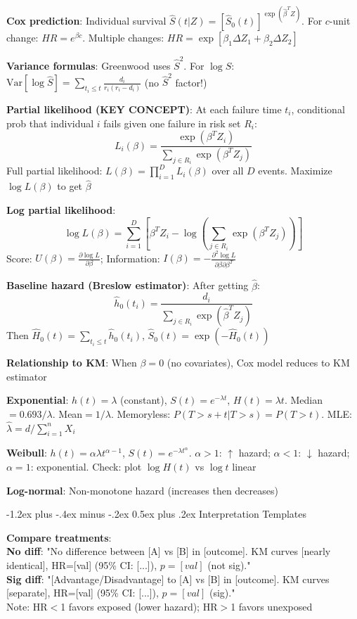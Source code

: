 ﻿\documentclass[10pt,letterpaper]{extarticle}
\makeatletter
\renewcommand{\section}{\@startsection{section}{1}{0mm}%
                                {-1.2ex plus -.4ex minus -.2ex}%
                                {0.5ex plus .2ex}%
                                {\normalfont\normalsize\bfseries}}
\newcommand{\h}[1]{\textbf{#1}}
\makeatother
\begin{document}
\begin{multicols}{3}
\h{Cox prediction}: Individual survival $\hat{S}(t|Z)=[\hat{S}_0(t)]^{\exp(\hat{\beta}^T Z)}$. For $c$-unit change: $HR=e^{\beta c}$. Multiple changes: $HR=\exp[\beta_1\Delta Z_1+\beta_2\Delta Z_2]$

\h{Variance formulas}: Greenwood uses $\hat{S}^2$. For $\log\hat{S}$: $\text{Var}[\log\hat{S}]=\sum_{t_i \le t}\frac{d_i}{r_i(r_i-d_i)}$ (no $\hat{S}^2$ factor!)

\h{Partial likelihood (KEY CONCEPT)}: At each failure time $t_i$, conditional prob that individual $i$ fails given one failure in risk set $R_i$:
$$L_i(\beta) = \frac{\exp(\beta^T Z_i)}{\sum_{j \in R_i} \exp(\beta^T Z_j)}$$
Full partial likelihood: $L(\beta) = \prod_{i=1}^D L_i(\beta)$ over all $D$ events. Maximize $\log L(\beta)$ to get $\hat{\beta}$

\h{Log partial likelihood}: \\
$$\log L(\beta) = \sum_{i=1}^D \left[\beta^T Z_i - \log\left(\sum_{j \in R_i} \exp(\beta^T Z_j)\right)\right]$$
Score: $U(\beta) = \frac{\partial \log L}{\partial \beta}$; Information: $I(\beta) = -\frac{\partial^2 \log L}{\partial \beta \partial \beta^T}$

\h{Baseline hazard (Breslow estimator)}: After getting $\hat{\beta}$:
$$\hat{h}_0(t_i) = \frac{d_i}{\sum_{j \in R_i} \exp(\hat{\beta}^T Z_j)}$$
Then $\hat{H}_0(t) = \sum_{t_i \le t} \hat{h}_0(t_i)$, $\hat{S}_0(t) = \exp(-\hat{H}_0(t))$

\h{Relationship to KM}: When $\beta=0$ (no covariates), Cox model reduces to KM estimator

\h{Exponential}: $h(t)=\lambda$ (constant), $S(t)=e^{-\lambda t}$, $H(t)=\lambda t$. Median$=0.693/\lambda$. Mean$=1/\lambda$. Memoryless: $P(T>s+t|T>s)=P(T>t)$. MLE: $\hat{\lambda}=d/\sum_{i=1}^n X_i$

\h{Weibull}: $h(t)=\alpha\lambda t^{\alpha-1}$, $S(t)=e^{-\lambda t^\alpha}$. $\alpha>1$: $\uparrow$ hazard; $\alpha<1$: $\downarrow$ hazard; $\alpha=1$: exponential. Check: plot $\log H(t)$ vs $\log t$ linear

\h{Log-normal}: Non-monotone hazard (increases then decreases)

\vspace{2pt}
\section{Interpretation Templates}

\h{Compare treatments}: \\
\textbf{No diff}: "No difference between [A] vs [B] in [outcome]. KM curves [nearly identical], HR=[val] (95\% CI: [...]), $p=[val]$ (not sig)." \\
\textbf{Sig diff}: "[Advantage/Disadvantage] to [A] vs [B] in [outcome]. KM curves [separate], HR=[val] (95\% CI: [...]), $p=[val]$ (sig)." \\
Note: HR$<$1 favors exposed (lower hazard); HR$>$1 favors unexposed


\end{multicols}
\end{document}
